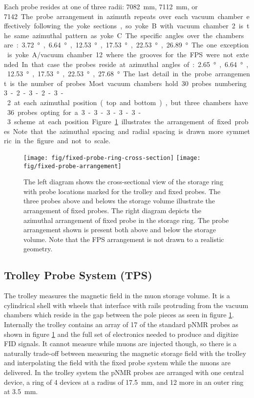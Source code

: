 Each probe resides at one of three radii: \SI{7082}{\mm}, \SI{7112}{\mm}, or \SI{7142}. The probe arrangement in azimuth repeats over each vacuum chamber effectively following the yoke sections, so yoke B with vacuum chamber 2 is the same azimuthal pattern as yoke C.  The specific angles over the chambers are: \SI{3.72}{\degree}, \SI{6.64}{\degree}, \SI{12.53}{\degree}, \SI{17.53}{\degree}, \SI{22.53}{\degree}, \SI{26.89}{\degree}.  The one exception is yoke A/vacuum chamber 12 where the grooves for the FPS were not extended.  In that case the probes reside at azimuthal angles of: \SI{2.65}{\degree}, \SI{6.64}{\degree}, \SI{12.53}{\degree}, \SI{17.53}{\degree}, \SI{22.53}{\degree}, \SI{27.68}{\degree}.  The last detail in the probe arrangement is the number of probes.  Most vacuum chambers hold 30 probes numbering 3-2-3-2-3-2 at each azimuthal position (top and bottom), but three chambers have 36 probes opting for a 3-3-3-3-3-3 scheme at each position.  Figure \ref{fig:fixed-probe-arrangement} illustrates the arrangement of fixed probes.  Note that the azimuthal spacing and radial spacing is drawn more symmetric in the figure and not to scale.

\begin{figure}
\centering
\texttt{[image: fig/fixed-probe-ring-cross-section]}
\texttt{[image: fig/fixed-probe-arrangement]}
\caption{
    The left diagram shows the cross-sectional view of the storage ring with probe locations marked for the trolley and fixed probes.  The three probes above and belows the storage volume illustrate the arrangement of fixed probes.  The right diagram depicts the azimuthal arrangement of fixed probe in the storage ring. The probe arrangement shown is present both above and below the storage volume. Note that the FPS arrangement is not drawn to a realistic geometry.
    \label{fig:fixed-probe-arrangement}
}
\end{figure}

\subsection{Trolley Probe System (TPS)}

The trolley measures the magnetic field in the muon storage volume.  It is a cylindrical shell with wheels that interface with rails protruding from the vacuum chambers which reside in the gap between the pole pieces as seen in figure \ref{fig:fixed-probe-arrangement}.  Internally the trolley contains an array of 17 of the standard pNMR probes as shown in figure \ref{fig:fixed-probe-arrangement} and the full set of electronics needed to produce and digitize FID signals.  It cannot measure while muons are injected though, so there is a naturally trade-off between measuring the magnetic storage field with the trolley and interpolating the field with the fixed probe system while the muons are delivered. In the trolley system the pNMR probes are arranged with one central device, a ring of 4 devices at a radius of \SI{17.5}{\mm}, and 12 more in an outer ring at \SI{3.5}{\mm}.

